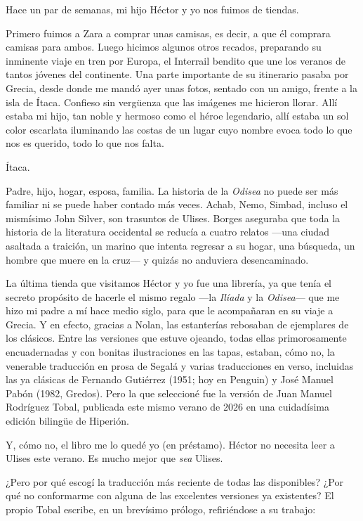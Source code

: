 \label{cap:osada}

Hace un par de semanas, mi hijo Héctor y yo nos fuimos de tiendas.

Primero fuimos a Zara a comprar unas camisas, es decir, a que él comprara camisas para ambos. Luego hicimos algunos otros recados, preparando su inminente viaje en tren por Europa, el Interrail bendito que une los veranos de tantos jóvenes del continente. Una parte importante de su itinerario pasaba por Grecia, desde donde me mandó ayer unas fotos, sentado con un amigo, frente a la isla de Ítaca. Confieso sin vergüenza que las imágenes me hicieron llorar. Allí estaba mi hijo, tan noble y hermoso como el héroe legendario, allí estaba un sol color escarlata iluminando las costas de un lugar cuyo nombre evoca todo lo que nos es querido, todo lo que nos falta.

Ítaca.

Padre, hijo, hogar, esposa, familia. La historia de la \emph{Odisea} no puede ser más familiar ni se puede haber contado más veces. Achab, Nemo, Simbad, incluso el mismísimo John Silver, son trasuntos de Ulises. Borges aseguraba que toda la historia de la literatura occidental se reducía a cuatro relatos ---una ciudad asaltada a traición, un marino que intenta regresar a su hogar, una búsqueda, un hombre que muere en la cruz--- y quizás no anduviera desencaminado.

La última tienda que visitamos Héctor y yo fue una librería, ya que tenía el secreto propósito de hacerle el mismo regalo ---la \emph{Ilíada} y la \emph{Odisea}--- que me hizo mi padre a mí hace medio siglo, para que le acompañaran en su viaje a Grecia. Y en efecto, gracias a Nolan, las estanterías rebosaban de ejemplares de los clásicos. Entre las versiones que estuve ojeando, todas ellas primorosamente encuadernadas y con bonitas ilustraciones en las tapas, estaban, cómo no, la venerable traducción en prosa de Segalá y varias traducciones en verso, incluidas las ya clásicas de Fernando Gutiérrez (1951; hoy en Penguin) y José Manuel Pabón (1982, Gredos). Pero la que seleccioné fue la versión de Juan Manuel Rodríguez Tobal, publicada este mismo verano de 2026 en una cuidadísima edición bilingüe de Hiperión.

Y, cómo no, el libro me lo quedé yo (en préstamo). Héctor no necesita leer a Ulises este verano. Es mucho mejor que \emph{sea} Ulises.

¿Pero por qué escogí la traducción más reciente de todas las disponibles? ¿Por qué no conformarme con alguna de las excelentes versiones ya existentes?
El propio Tobal escribe, en un brevísimo prólogo, refiriéndose a su trabajo:

